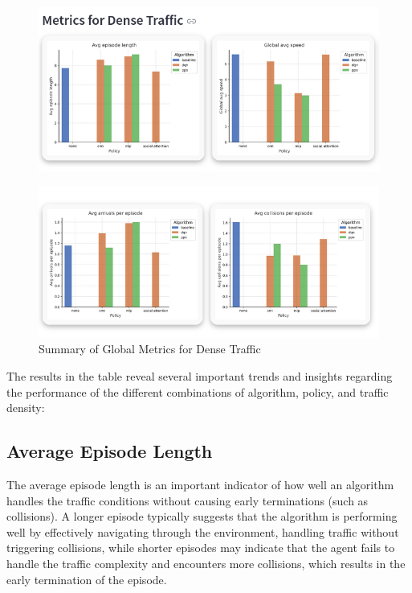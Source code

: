 \begin{figure}[H]
    \centering
    \includegraphics[height=0.215\textheight]{images/app_global_plots_dense1.png} 
\end{figure}

\begin{figure}[H]
    \centering
    \includegraphics[height=0.2\textheight]{images/app_global_plots_dense2.png} 
    \caption{Summary of Global Metrics for Dense Traffic}
\end{figure}

The results in the table reveal several important trends and insights regarding the performance of the different combinations of algorithm, policy, and traffic density:

\subsection{Average Episode Length}

The average episode length is an important indicator of how well an algorithm handles the traffic conditions without causing early terminations (such as collisions). A longer episode typically suggests that the algorithm is performing well by effectively navigating through the environment, handling traffic without triggering collisions, while shorter episodes may indicate that the agent fails to handle the traffic complexity and encounters more collisions, which results in the early termination of the episode.


